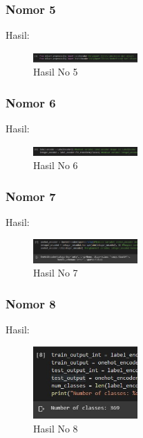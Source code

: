 \begin{enumerate}
\subsubsection{Nomor 5}
\hfill\break

Hasil:
\begin{figure}[H]
\centering
	\includegraphics[width=4cm]{figures/1174075/7/no5.jpg}
	\caption{Hasil No 5}
\end{figure}

\subsubsection{Nomor 6}
\hfill\break

Hasil:
\begin{figure}[H]
\centering
	\includegraphics[width=4cm]{figures/1174075/7/no6.jpg}
	\caption{Hasil No 6}
\end{figure}

\subsubsection{Nomor 7}
\hfill\break

Hasil:
\begin{figure}[H]
\centering
	\includegraphics[width=4cm]{figures/1174075/7/no7.jpg}
	\caption{Hasil No 7}
\end{figure}

\subsubsection{Nomor 8}
\hfill\break

Hasil:
\begin{figure}[H]
\centering
	\includegraphics[width=4cm]{figures/1174075/7/no8.jpg}
	\caption{Hasil No 8}
\end{figure}


\end{enumerate}
